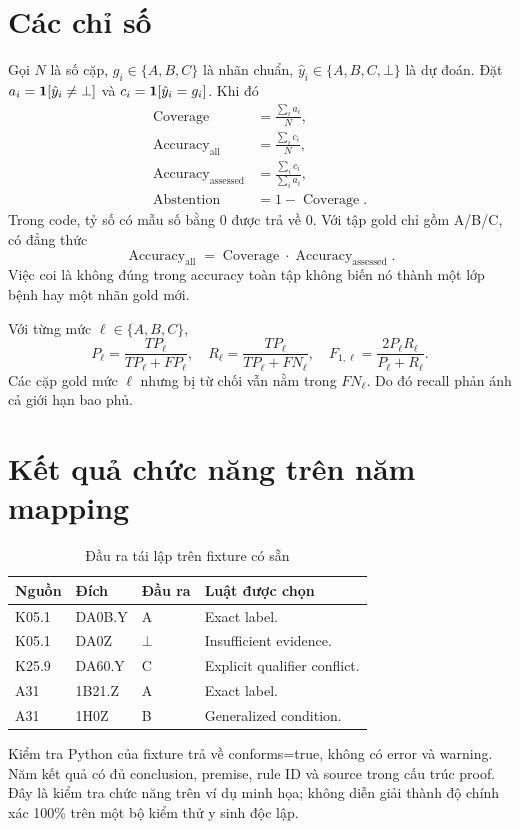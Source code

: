 \section{Các chỉ số}
Gọi $N$ là số cặp, $g_i\in\{A,B,C\}$ là nhãn chuẩn,
$\hat y_i\in\{A,B,C,\bot\}$ là dự đoán.
Đặt $a_i=\mathbf{1}[\hat y_i\ne\bot]$ và
$c_i=\mathbf{1}[\hat y_i=g_i]$. Khi đó
\begin{align}
 \operatorname{Coverage} &= \frac{\sum_i a_i}{N},\\
 \operatorname{Accuracy}_{\mathrm{all}} &= \frac{\sum_i c_i}{N},\\
 \operatorname{Accuracy}_{\mathrm{assessed}}
 &= \frac{\sum_i c_i}{\sum_i a_i},\\
 \operatorname{Abstention} &= 1-\operatorname{Coverage}.
\end{align}
Trong code, tỷ số có mẫu số bằng 0 được trả về 0.
Với tập gold chỉ gồm A/B/C, có đẳng thức
\begin{equation}
 \operatorname{Accuracy}_{\mathrm{all}}
 =\operatorname{Coverage}\cdot
  \operatorname{Accuracy}_{\mathrm{assessed}}.
 \label{eq:metricrelation}
\end{equation}
Việc coi \Unassessed{} là không đúng trong accuracy toàn tập không
biến nó thành một lớp bệnh hay một nhãn gold mới.

Với từng mức $\ell\in\{A,B,C\}$,
\begin{equation}
 P_\ell=\frac{TP_\ell}{TP_\ell+FP_\ell},\quad
 R_\ell=\frac{TP_\ell}{TP_\ell+FN_\ell},\quad
 F_{1,\ell}=\frac{2P_\ell R_\ell}{P_\ell+R_\ell}.
\end{equation}
Các cặp gold mức $\ell$ nhưng bị từ chối vẫn nằm trong $FN_\ell$.
Do đó recall phản ánh cả giới hạn bao phủ.

\section{Kết quả chức năng trên năm mapping}
\begin{table}[htbp]
\centering\small
\caption{Đầu ra tái lập trên fixture có sẵn}\label{tab:sample}
\begin{tabularx}{\textwidth}{lllY}
\toprule
Nguồn & Đích & Đầu ra & Luật được chọn\\
\midrule
K05.1 & DA0B.Y & A & Exact label.\\
K05.1 & DA0Z & $\bot$ & Insufficient evidence.\\
K25.9 & DA60.Y & C & Explicit qualifier conflict.\\
A31 & 1B21.Z & A & Exact label.\\
A31 & 1H0Z & B & Generalized condition.\\
\bottomrule
\end{tabularx}
\end{table}
Kiểm tra Python của fixture trả về conforms=true, không có error và warning.
Năm kết quả có đủ conclusion, premise, rule ID và source trong cấu trúc proof.
Đây là kiểm tra chức năng trên ví dụ minh họa; không diễn giải thành
độ chính xác 100\% trên một bộ kiểm thử y sinh độc lập.

